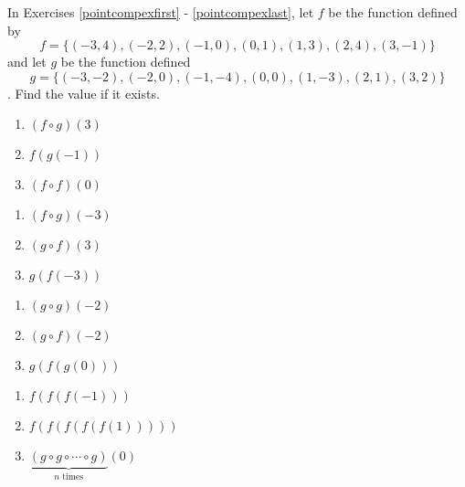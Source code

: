 In Exercises \ref{pointcompexfirst} - \ref{pointcompexlast}, let $f$ be the function defined by \[f = \{(-3, 4), (-2, 2), (-1, 0), (0, 1), (1, 3), (2, 4), (3, -1)\}\] and let $g$ be the function defined \[g = \{(-3, -2), (-2, 0), (-1, -4), (0, 0), (1, -3), (2, 1), (3, 2)\}\].  Find the value if it exists.

\begin{multicols}{3}
\begin{enumerate}
\setcounter{enumi}{\value{HW}}

\item $(f \circ g)(3)$ \label{pointcompexfirst}
\item $f(g(-1))$
\item $(f \circ f)(0)$

\setcounter{HW}{\value{enumi}}
\end{enumerate}
\end{multicols}

\begin{multicols}{3}
\begin{enumerate}
\setcounter{enumi}{\value{HW}}


\item $(f \circ g)(-3)$
\item $(g \circ f)(3)$
\item $g(f(-3))$


\setcounter{HW}{\value{enumi}}
\end{enumerate}
\end{multicols}

\begin{multicols}{3}
\begin{enumerate}
\setcounter{enumi}{\value{HW}}

\item $(g \circ g)(-2)$
\item $(g \circ f)(-2)$
\item $g(f(g(0)))$


\setcounter{HW}{\value{enumi}}
\end{enumerate}
\end{multicols}

\begin{multicols}{3}
\begin{enumerate}
\setcounter{enumi}{\value{HW}}

\item $f(f(f(-1)))$
\item $f(f(f(f(f(1)))))$
\item $\underbrace{(g \circ g \circ \cdots \circ g)}_{\mbox{$n$ times}}(0)$ \label{pointcompexlast}


\setcounter{HW}{\value{enumi}}
\end{enumerate}
\end{multicols}

